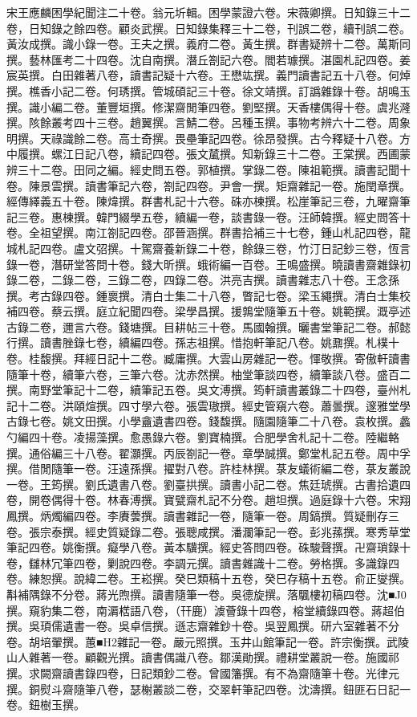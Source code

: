 \begin{pinyinscope}
宋王應麟困學紀聞注二十卷。翁元圻輯。困學蒙證六卷。宋薇卿撰。日知錄三十二卷，日知錄之餘四卷。顧炎武撰。日知錄集釋三十二卷，刊誤二卷，續刊誤二卷。黃汝成撰。識小錄一卷。王夫之撰。義府二卷。黃生撰。群書疑辨十二卷。萬斯同撰。藝林匯考二十四卷。沈自南撰。潛丘劄記六卷。閻若璩撰。湛園札記四卷。姜宸英撰。白田雜著八卷，讀書記疑十六卷。王懋竑撰。義門讀書記五十八卷。何焯撰。樵香小記二卷。何琇撰。管城碩記三十卷。徐文靖撰。訂譌雜錄十卷。胡鳴玉撰。識小編二卷。董豐垣撰。修潔齋閒筆四卷。劉堅撰。天香樓偶得十卷。虞兆漋撰。陔餘叢考四十三卷。趙翼撰。言鯖二卷。呂種玉撰。事物考辨六十二卷。周象明撰。天祿識餘二卷。高士奇撰。畏壘筆記四卷。徐昂發撰。古今釋疑十八卷。方中履撰。螺江日記八卷，續記四卷。張文檒撰。知新錄三十二卷。王棠撰。西圃蒙辨三十二卷。田同之編。經史問五卷。郭植撰。掌錄二卷。陳祖範撰。讀書記聞十卷。陳景雲撰。讀書筆記六卷，劄記四卷。尹會一撰。矩齋雜記一卷。施閏章撰。經傳繹義五十卷。陳煒撰。群書札記十六卷。硃亦棟撰。松崖筆記三卷，九曜齋筆記三卷。惠棟撰。韓門綴學五卷，續編一卷，談書錄一卷。汪師韓撰。經史問答十卷。全祖望撰。南江劄記四卷。邵晉涵撰。群書拾補三十七卷，鍾山札記四卷，龍城札記四卷。盧文弨撰。十駕齋養新錄二十卷，餘錄三卷，竹汀日記鈔三卷，恆言錄一卷，潛研堂答問十卷。錢大昕撰。蛾術編一百卷。王鳴盛撰。曉讀書齋雜錄初錄二卷，二錄二卷，三錄二卷，四錄二卷。洪亮吉撰。讀書雜志八十卷。王念孫撰。考古錄四卷。鍾褱撰。清白士集二十八卷，瞥記七卷。梁玉繩撰。清白士集校補四卷。蔡云撰。庭立紀聞四卷。梁學昌撰。援鶉堂隨筆五十卷。姚範撰。溉亭述古錄二卷，邇言六卷。錢塘撰。目耕帖三十卷。馬國翰撰。曬書堂筆記二卷。郝懿行撰。讀書脞錄七卷，續編四卷。孫志祖撰。惜抱軒筆記八卷。姚鼐撰。札樸十卷。桂馥撰。拜經日記十二卷。臧庸撰。大雲山房雜記一卷。惲敬撰。寄傲軒讀書隨筆十卷，續筆六卷，三筆六卷。沈赤然撰。柚堂筆談四卷，續筆談八卷。盛百二撰。南野堂筆記十二卷，續筆記五卷。吳文溥撰。筠軒讀書叢錄二十四卷，臺州札記十二卷。洪頤煊撰。四寸學六卷。張雲璈撰。經史管窺六卷。蕭曇撰。邃雅堂學古錄七卷。姚文田撰。小學盦遺書四卷。錢馥撰。隨園隨筆二十八卷。袁枚撰。蠡勺編四十卷。凌揚藻撰。愈愚錄六卷。劉寶楠撰。合肥學舍札記十二卷。陸繼輅撰。通俗編三十八卷。翟灝撰。丙辰劄記一卷。章學誠撰。鄭堂札記五卷。周中孚撰。借閒隨筆一卷。汪遠孫撰。擢對八卷。許桂林撰。菉友蟻術編二卷，菉友叢說一卷。王筠撰。劉氏遺書八卷。劉臺拱撰。讀書小記二卷。焦廷琥撰。古書拾遺四卷，開卷偶得十卷。林春溥撰。寶甓齋札記不分卷。趙坦撰。過庭錄十六卷。宋翔鳳撰。炳燭編四卷。李賡蕓撰。讀書雜記一卷，隨筆一卷。周鎬撰。質疑刪存三卷。張宗泰撰。經史質疑錄二卷。張聰咸撰。潘瀾筆記一卷。彭兆蓀撰。寒秀草堂筆記四卷。姚衡撰。癡學八卷。黃本驥撰。經史答問四卷。硃駿聲撰。卍齋瑣錄十卷，讎林冗筆四卷，剿說四卷。李調元撰。讀書雜識十二卷。勞格撰。多識錄四卷。練恕撰。說緯二卷。王崧撰。癸巳類稿十五卷，癸巳存稿十五卷。俞正燮撰。斠補隅錄不分卷。蔣光煦撰。讀書隨筆一卷。吳德旋撰。落颿樓初稿四卷。沈■J0撰。窺豹集二卷，南漘楛語八卷，（幵鹿）澞薈錄十四卷，榕堂續錄四卷。蔣超伯撰。吳頊儒遺書一卷。吳卓信撰。遜志齋雜鈔十卷。吳翌鳳撰。研六室雜著不分卷。胡培翬撰。蕙■H2雜記一卷。嚴元照撰。玉井山館筆記一卷。許宗衡撰。武陵山人雜著一卷。顧觀光撰。讀書偶識八卷。鄒漢勛撰。禮耕堂叢說一卷。施國祁撰。求闕齋讀書錄四卷，日記類鈔二卷。曾國籓撰。有不為齋隨筆十卷。光律元撰。銅熨斗齋隨筆八卷，瑟榭叢談二卷，交翠軒筆記四卷。沈濤撰。鈕匪石日記一卷。鈕樹玉撰。
\end{pinyinscope}
